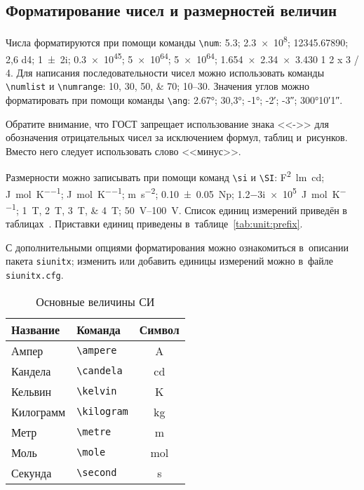 \subsection{Форматирование чисел и размерностей величин}\label{sec:units}

Числа форматируются при помощи команды \verb|\num|:
\num{5,3};
\num{2,3e8};
\num{12345,67890};
\num{2,6 d4};
\num{1+-2i};
\num{.3e45};
\num[exponent-base=2]{5 e64};
\num[exponent-base=2,exponent-to-prefix]{5 e64};
\num{1.654 x 2.34 x 3.430}
\num{1 2 x 3 / 4}.
Для написания последовательности чисел можно использовать команды \verb|\numlist| и \verb|\numrange|:
\numlist{10;30;50;70}; \numrange{10}{30}.
Значения углов можно форматировать при помощи команды \verb|\ang|:
\ang{2.67};
\ang{30,3};
\ang{-1;;};
\ang{;-2;};
\ang{;;-3};
\ang{300;10;1}.

Обратите внимание, что ГОСТ запрещает использование знака <<->> для обозначения отрицательных чисел
за исключением формул, таблиц и~рисунков.
Вместо него следует использовать слово <<минус>>.

Размерности можно записывать при помощи команд \verb|\si| и \verb|\SI|:
\si{\farad\squared\lumen\candela};
\si{\joule\per\mole\per\kelvin};
\si[per-mode = symbol-or-fraction]{\joule\per\mole\per\kelvin};
\si{\metre\per\second\squared};
\SI{0.10(5)}{\neper};
\SI{1.2-3i e5}{\joule\per\mole\per\kelvin};
\SIlist{1;2;3;4}{\tesla};
\SIrange{50}{100}{\volt}.
Список единиц измерений приведён в таблицах~.
Приставки единиц приведены в~таблице~\ref{tab:unit:prefix}.

С дополнительными опциями форматирования можно ознакомиться в~описании пакета \texttt{siunitx};
изменить или добавить единицы измерений можно в~файле \texttt{siunitx.cfg}.

\begin{table}
    \centering
    \captionsetup{justification=centering} %
    \caption{Основные величины СИ}\label{tab:unit:base}
    \begin{tabular}{llc}
        \toprule
        Название  & Команда                & Символ         \\
        \midrule
        Ампер     & \verb|\ampere| & \si{\ampere}   \\
        Кандела   & \verb|\candela| & \si{\candela}  \\
        Кельвин   & \verb|\kelvin| & \si{\kelvin}   \\
        Килограмм & \verb|\kilogram| & \si{\kilogram} \\
        Метр      & \verb|\metre| & \si{\metre}    \\
        Моль      & \verb|\mole| & \si{\mole}     \\
        Секунда   & \verb|\second| & \si{\second}   \\
        \bottomrule
    \end{tabular}
\end{table}

